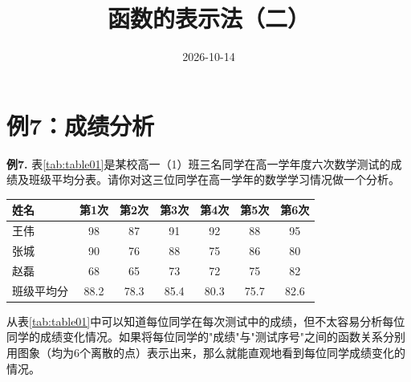 \documentclass[10pt,aspectratio=169,serif]{beamer}
\title[函数的表示法]{函数的表示法（二）}
\subtitle{}
\author{}
\institute{}
\date{2026-10-14}
\begin{document}
\begin{frame}
  \titlepage
\end{frame}

\section{例7：成绩分析}

\begin{frame}[t]%
\textbf{例7.} 表\ref{tab:table01}是某校高一（1）班三名同学在高一学年度六次数学测试的成绩及班级平均分表。请你对这三位同学在高一学年的数学学习情况做一个分析。

\vspace{0.5em}
\small
\begin{center}
\begin{tabular}{l|cccccc}
\toprule
\textbf{姓名} & \textbf{第1次} & \textbf{第2次} & \textbf{第3次} & \textbf{第4次} & \textbf{第5次} & \textbf{第6次} \\
\midrule
王伟 & 98 & 87 & 91 & 92 & 88 & 95 \\
张城 & 90 & 76 & 88 & 75 & 86 & 80 \\
赵磊 & 68 & 65 & 73 & 72 & 75 & 82 \\
班级平均分 & 88.2 & 78.3 & 85.4 & 80.3 & 75.7 & 82.6 \\
\bottomrule
\end{tabular}
\label{tab:table01}
\end{center}
\end{frame}

\begin{frame}[t]%
\begin{tcolorbox}[colback=xyyg_orange!10,colframe=xyyg_orange!60,title=\textbf{解:}]
从表\ref{tab:table01}中可以知道每位同学在每次测试中的成绩，但不太容易分析每位同学的成绩变化情况。如果将每位同学的"成绩"与"测试序号"之间的函数关系分别用图象（均为6个离散的点）表示出来，那么就能直观地看到每位同学成绩变化的情况。
\end{tcolorbox}

\vspace{0.5em}

\end{frame}
\end{document}
